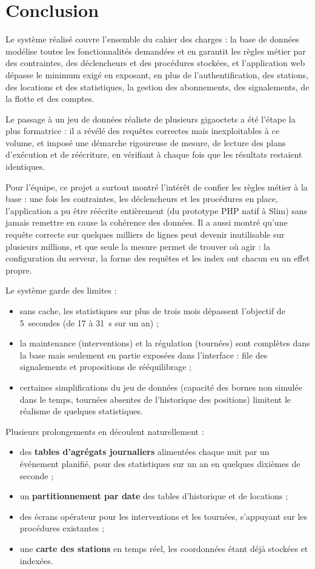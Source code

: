 \section{Conclusion}\label{sec:conclusion}

Le système réalisé couvre l'ensemble du cahier des charges : la base de données modélise toutes les fonctionnalités demandées et en garantit les règles métier par des contraintes, des déclencheurs et des procédures stockées, et l'application web dépasse le minimum exigé en exposant, en plus de l'authentification, des stations, des locations et des statistiques, la gestion des abonnements, des signalements, de la flotte et des comptes.

Le passage à un jeu de données réaliste de plusieurs gigaoctets a été l'étape la plus formatrice : il a révélé des requêtes correctes mais inexploitables à ce volume, et imposé une démarche rigoureuse de mesure, de lecture des plans d'exécution et de réécriture, en vérifiant à chaque fois que les résultats restaient identiques.

Pour l'équipe, ce projet a surtout montré l'intérêt de confier les règles métier à la base : une fois les contraintes, les déclencheurs et les procédures en place, l'application a pu être réécrite entièrement (du prototype PHP natif à Slim) sans jamais remettre en cause la cohérence des données. Il a aussi montré qu'une requête correcte sur quelques milliers de lignes peut devenir inutilisable sur plusieurs millions, et que seule la mesure permet de trouver où agir : la configuration du serveur, la forme des requêtes et les index ont chacun eu un effet propre.

Le système garde des limites :
\begin{itemize}
	\item sans cache, les statistiques sur plus de trois mois dépassent l'objectif de 5~secondes (de 17 à 31~s sur un an) ;
	\item la maintenance (interventions) et la régulation (tournées) sont complètes dans la base mais seulement en partie exposées dans l'interface : file des signalements et propositions de rééquilibrage ;
	\item certaines simplifications du jeu de données (capacité des bornes non simulée dans le temps, tournées absentes de l'historique des positions) limitent le réalisme de quelques statistiques.
\end{itemize}

Plusieurs prolongements en découlent naturellement :
\begin{itemize}
	\item des \textbf{tables d'agrégats journaliers} alimentées chaque nuit par un événement planifié, pour des statistiques sur un an en quelques dixièmes de seconde ;
	\item un \textbf{partitionnement par date} des tables d'historique et de locations ;
	\item des écrans opérateur pour les interventions et les tournées, s'appuyant sur les procédures existantes ;
	\item une \textbf{carte des stations} en temps réel, les coordonnées étant déjà stockées et indexées.
\end{itemize}
